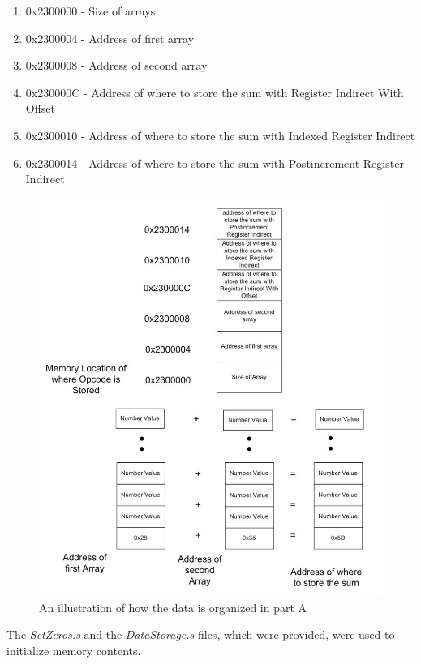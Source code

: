 \documentclass[letterpaper]{article}
\begin{document}
    \begin{enumerate}
      \item 0x2300000 - Size of arrays
      \item 0x2300004 - Address of first array
      \item 0x2300008 - Address of second array
      \item 0x230000C - Address of where to store the sum with Register Indirect With Offset
      \item 0x2300010 - Address of where to store the sum with Indexed Register Indirect
      \item 0x2300014 - Address of where to store the sum with Postincrement Register Indirect
    \end{enumerate}

    \begin{figure}[h!]
      \centering
      \includegraphics[width=.6\textwidth]{mema.jpg}
      \caption{An illustration of how the data is organized in part A}
    \end{figure}

    \noindent The \textit{SetZeros.s} and the \textit{DataStorage.s}
    files, which were provided, were used to initialize memory contents.
\end{document}
